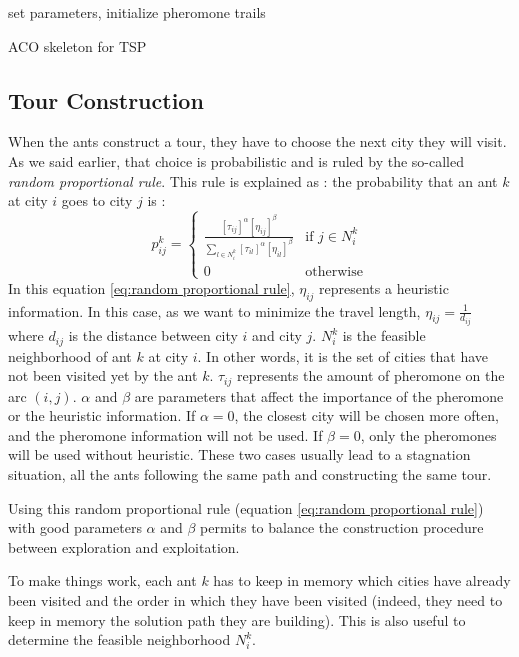\begin{algorithm}
set parameters, initialize pheromone trails\;
\caption{ACO skeleton for TSP}\label{alg:acometa}
\end{algorithm}

\subsection{Tour Construction}
When the ants construct a tour, they have to choose the next city they will visit. As we said earlier, that choice is probabilistic and is ruled by the so-called \emph{random proportional rule}. This rule is explained as :  the probability that an ant $k$ at city $i$ goes to city $j$ is :
\begin{equation}
	p_{ij}^k =
	\begin{cases}
		\frac{[\tau_{ij}]^\alpha [\eta_{ij}]^\beta}{\sum_{l\in N_i^k}{[\tau_{il}]^\alpha [\eta_{il}]^\beta}} & \text{if } j\in N_i^k\\
		0 & \text{otherwise}
		\end{cases}
	\label{eq:random proportional rule}
\end{equation}
In this equation \ref{eq:random proportional rule}, $\eta_{ij}$ represents a heuristic information. In this case, as we want to minimize the travel length, $\eta_{ij} = \frac{1}{d_{ij}}$ where $d_{ij}$ is the distance between city $i$ and city $j$. $N_i^k$ is the feasible neighborhood of ant $k$ at city $i$. In other words, it is the set of cities that have not been visited yet by the ant $k$. $\tau_{ij}$ represents the amount of pheromone on the arc $(i,j)$. $\alpha$ and $\beta$ are parameters that affect the importance of the pheromone or the heuristic information. If $\alpha = 0$, the closest city will be chosen more often, and the pheromone information will not be used. If $\beta = 0$, only the pheromones will be used without heuristic. These two cases usually lead to a stagnation situation, all the ants following the same path and constructing the same tour.


Using this random proportional rule (equation \ref{eq:random proportional rule}) with good parameters $\alpha$ and $\beta$ permits to balance the construction procedure between exploration and exploitation.

To make things work, each ant $k$ has to keep in memory which cities have already been visited and the order in which they have been visited (indeed, they need to keep in memory the solution path they are building). This is also useful to determine the feasible neighborhood $N_i^k$.

